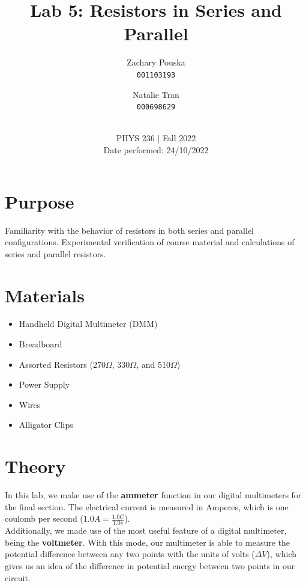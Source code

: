 \documentclass[titlepage]{article}
\begin{document}
\title{\textbf{Lab 5: Resistors in Series and Parallel}}
\author{
    Zachary Pouska\\
    \texttt{001103193}\\
    \and
    Natalie Tran \\ 
    \texttt{000698629}\\ \\
} 

\date{PHYS 236 | Fall 2022\\
Date performed: 24/10/2022}


	\maketitle


	\section{Purpose}
    Familiarity with the behavior of resistors in both series and parallel configurations. Experimental verification of course material and calculations of series and parallel resistors. 

    \section{Materials} 
    \begin{itemize}
        \item Handheld Digital Multimeter (DMM)
        \item Breadboard
        \item Assorted Resistors (270$\Omega$, 330$\Omega$, and 510$\Omega$)
        \item Power Supply
        \item Wires
        \item Alligator Clips
    \end{itemize}


	\section{Theory}	
    In this lab, we make use of the \textbf{ammeter} function in our digital multimeters for the final section. The electrical current is measured in Amperes, which is one coulomb per second ($1.0 A = \frac{1.0C}{1.0 s}$).\\
    \vspace{5pt}
    Additionally, we made use of the most useful feature of a digital multimeter, being the \textbf{voltmeter}. With this mode, our multimeter is able to measure the potential difference between any two points with the units of volts ($\Delta V$), which gives us an idea of the difference in potential energy between two points in our circuit.\\ 
\end{document}
